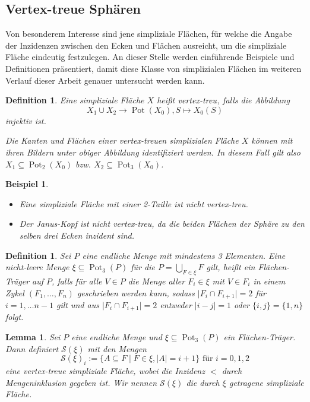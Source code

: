 \documentclass[12pt,titlepage,twoside,cleardoublepage]{article}
\theoremstyle{nummermitklammern}
\newtheorem{lemma}[temp]{Lemma}
\newtheorem{bsp}[temp]{Beispiel}
\newtheorem{definition}[temp]{Definition}
\newtheorem{definition}[zahl]{Definition}
\newtheorem{lemma}[zahl]{Lemma}
\newtheorem{bsp}[zahl]{Beispiel}
\numberwithin{equation}{section}
\DeclareMathOperator{\Pot}{Pot}
\begin{document}
\subsection{Vertex-treue Sphären}
Von besonderem Interesse sind jene simpliziale Flächen, für welche die Angabe der Inzidenzen zwischen den Ecken und Flächen ausreicht, um die simpliziale Fläche eindeutig festzulegen. An dieser Stelle werden einführende Beispiele und Definitionen präsentiert, damit diese Klasse von simplizialen Flächen im weiteren Verlauf dieser Arbeit genauer untersucht werden kann.
\begin{definition}
Eine simpliziale Fläche $X$ heißt $\emph{vertex-treu}$, falls die Abbildung
\[
X_1 \cup X_2 \to \Pot(X_0),S \mapsto X_0(S)
\]
 injektiv ist. 

Die Kanten und Flächen einer vertex-treuen simplizialen Fläche $X$ können  mit ihren Bildern unter obiger Abbildung identifiziert werden. In diesem Fall gilt also $X_1 \subseteq \Pot_2(X_0)$ bzw. $X_2\subseteq \Pot_3(X_0)$. 
\end{definition}
\begin{bsp}
\begin{itemize}
\item Eine simpliziale Fläche mit einer 2-Taille ist nicht vertex-treu.
\item Der Janus-Kopf ist nicht vertex-treu, da die beiden Flächen der Sphäre  zu den selben drei Ecken inzident sind.
\end{itemize}
\end{bsp}
\begin{definition}
Sei $P$ eine endliche Menge mit mindestens 3 Elementen. Eine nicht-leere Menge $\xi \subseteq \Pot_3(P)$ für die $P=\bigcup_{F\in \xi} F$ gilt, heißt ein \emph{Flächen-Träger} auf $P$, falls für alle $V\in P$ die Menge aller $F_i \in \xi$ mit $V \in F_i$ in einem Zykel  $(F_1,\ldots ,F_n)$ geschrieben werden kann, sodass $\vert F_i \cap F_{i+1}\vert=2 $ für $i=1,\ldots n-1$ gilt und aus $\vert F_i \cap F_{i+1}\vert=2$ entweder $\vert i-j\vert =1$ oder $\{i,j\}=\{1,n\}$ folgt.  
\end{definition}
\begin{lemma}
Sei $P$ eine endliche Menge und $\xi \subseteq \Pot_3(P)$ ein Flächen-Träger. Dann definiert $\mathcal{S}(\xi)$ mit den Mengen 
\[
\mathcal{S}(\xi)_i:=\{A\subseteq F\mid F\in \xi,\vert A\vert=i+1\}\text{ für }i=0,1,2 
\]eine vertex-treue simpliziale Fläche, wobei die Inzidenz $<$ durch Mengeninklusion gegeben ist. Wir nennen $\mathcal{S}(\xi)$ die durch $\xi$ \emph{getragene} simpliziale Fläche.
\end{lemma}
\end{document}
